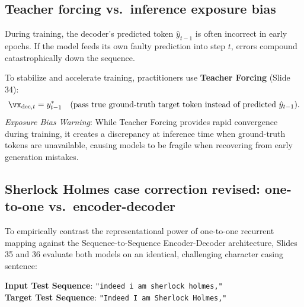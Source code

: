 \documentclass[../../main.tex]{subfiles}
\begin{document}
\subsection{Teacher forcing vs.~inference exposure bias}
During training, the decoder's predicted token $\hat{y}_{t-1}$ is often incorrect in early epochs. If the model feeds its own faulty prediction into step $t$, errors compound catastrophically down the sequence.

To stabilize and accelerate training, practitioners use \textbf{Teacher Forcing} (Slide 34):
\begin{equation}
\label{eq:teacher_forcing}
\vx_{\text{dec}, t} = y_{t-1}^* \quad (\text{pass true ground-truth target token instead of predicted } \hat{y}_{t-1}).
\end{equation}
\emph{Exposure Bias Warning}: While Teacher Forcing provides rapid convergence during training, it creates a discrepancy at inference time when ground-truth tokens are unavailable, causing models to be fragile when recovering from early generation mistakes.

\subsection{Sherlock Holmes case correction revised: one-to-one vs.~encoder-decoder}
\label{subsec:sherlock_seq2seq_comparison}

To empirically contrast the representational power of one-to-one recurrent mapping against the Sequence-to-Sequence Encoder-Decoder architecture, Slides 35 and 36 evaluate both models on an identical, challenging character casing sentence:
\begin{center}
\textbf{Input Test Sequence}: \texttt{"indeed i am sherlock holmes,"} \\
\textbf{Target Test Sequence}: \texttt{"Indeed I am Sherlock Holmes,"}
\end{center}
\end{document}
